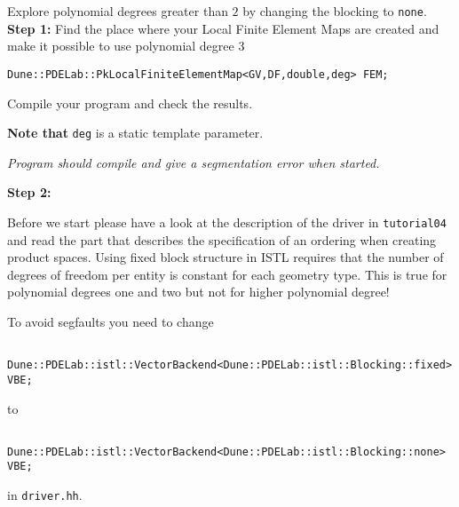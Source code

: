 \documentclass[12pt,a4paper]{article}
\begin{document}
\begin{Exercise}{ Explore polynomial degrees greater than $2$ by changing the blocking
to \lstinline{none}. }
 \textbf{Step 1:}
Find the place where your Local Finite Element Maps are created and make it possible to use polynomial degree 3

\begin{lstlisting}
Dune::PDELab::PkLocalFiniteElementMap<GV,DF,double,deg> FEM;
\end{lstlisting}

Compile your program and check the results.

\textbf{Note that} \lstinline!deg! is a static template parameter.

\textit{Program should compile and give a segmentation error when started.}

 \textbf{Step 2:}

Before we start please have a look at the description of the driver in \lstinline!tutorial04! and read the part that describes the specification of an ordering when creating
product spaces. Using fixed block structure in ISTL requires that the number of degrees of freedom per entity is constant for each geometry type. This is true for polynomial degrees one and two but not for higher polynomial degree!

 To avoid segfaults you need to change

  \begin{lstlisting}
  Dune::PDELab::istl::VectorBackend<Dune::PDELab::istl::Blocking::fixed> VBE;  \end{lstlisting}
 to
\begin{lstlisting}
  Dune::PDELab::istl::VectorBackend<Dune::PDELab::istl::Blocking::none> VBE;  \end{lstlisting}
 in  \lstinline!driver.hh!.

\end{Exercise}
\end{document}
